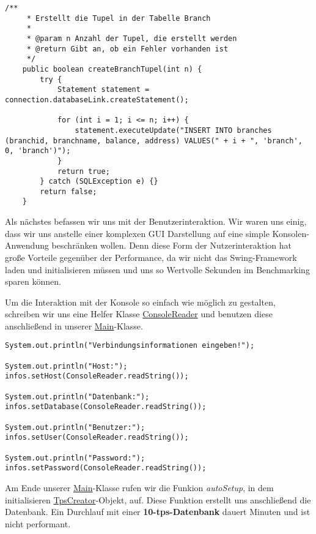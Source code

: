 \begin{lstlisting}[caption={Eine der drei Tupel Funktionen}]
	/**
	 * Erstellt die Tupel in der Tabelle Branch
	 * 
	 * @param n Anzahl der Tupel, die erstellt werden
	 * @return Gibt an, ob ein Fehler vorhanden ist
	 */
	public boolean createBranchTupel(int n) {
		try {
			Statement statement = connection.databaseLink.createStatement();

			for (int i = 1; i <= n; i++) {
				statement.executeUpdate("INSERT INTO branches (branchid, branchname, balance, address) VALUES(" + i + ", 'branch', 0, 'branch')");
			}
			return true;
		} catch (SQLException e) {}		
		return false;
	}
\end{lstlisting}

Als nächstes befassen wir uns mit der Benutzerinteraktion. Wir waren uns
einig, dass wir uns anstelle einer komplexen GUI Darstellung auf eine simple
Konsolen-Anwendung beschränken wollen. Denn diese Form der
Nutzerinteraktion hat große Vorteile gegenüber der Performance, da wir nicht
das Swing-Framework laden und initialisieren müssen und uns so Wertvolle
Sekunden im Benchmarking sparen können.

Um die Interaktion mit der Konsole so einfach wie möglich zu gestalten,
schreiben wir uns eine Helfer Klasse \hyperref[lst:crv2]{ConsoleReader} und
benutzen diese anschließend in unserer \hyperref[lst:mainv2]{Main}-Klasse.

\begin{lstlisting}[caption={Verbindungsinformationen per Konsole}]
System.out.println("Verbindungsinformationen eingeben!");
			
System.out.println("Host:");
infos.setHost(ConsoleReader.readString());

System.out.println("Datenbank:");
infos.setDatabase(ConsoleReader.readString());

System.out.println("Benutzer:");
infos.setUser(ConsoleReader.readString());

System.out.println("Password:");
infos.setPassword(ConsoleReader.readString());
\end{lstlisting}

Am Ende unserer \hyperref[lst:mainv2]{Main}-Klasse rufen wir die Funkion
\textit{autoSetup}, in dem initialisieren \hyperref[lst:tpsv2]{TpsCreator}-Objekt, 
auf. Diese Funktion erstellt uns anschließend die Datenbank. Ein Durchlauf mit
einer \textbf{10-tps-Datenbank} dauert  Minuten und ist nicht performant.
\clearpage
